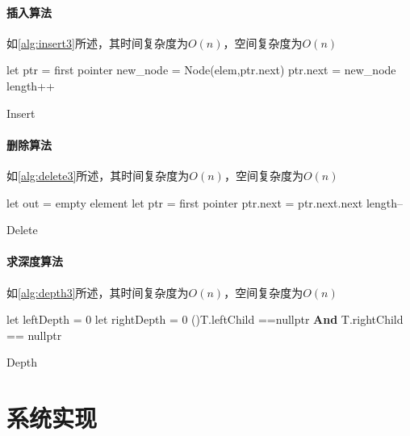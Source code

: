 \paragraph{插入算法}如\autoref{alg:insert3}所述，其时间复杂度为$O(n)$，空间复杂度为$O(n)$
\par
\begin{algorithm}[H]
    \SetAlgoLined
    let ptr = first pointer\;
    new\_node = Node(elem,ptr.next)\;
    ptr.next = new\_node\;
    length++
\caption{Insert}\label{alg:insert3}
\end{algorithm}
\paragraph{删除算法}如\autoref{alg:delete3}所述，其时间复杂度为$O(n)$，空间复杂度为$O(n)$
\par
\begin{algorithm}[H]
    \SetAlgoLined
    let out = empty element\;
    let ptr = first pointer\;
    ptr.next = ptr.next.next\;
    length--
\caption{Delete}\label{alg:delete3}
\end{algorithm}
\paragraph{求深度算法}如\autoref{alg:depth3}所述，其时间复杂度为$O(n)$，空间复杂度为$O(n)$
\par
\begin{algorithm}[H]
    \SetAlgoLined
    let leftDepth = 0\;
    let rightDepth = 0\;
    \If(){T.leftChild ==nullptr \textbf{And} T.rightChild == nullptr}{%
        \;
    }

\caption{Depth}\label{alg:depth3}
\end{algorithm}

\section{系统实现}
